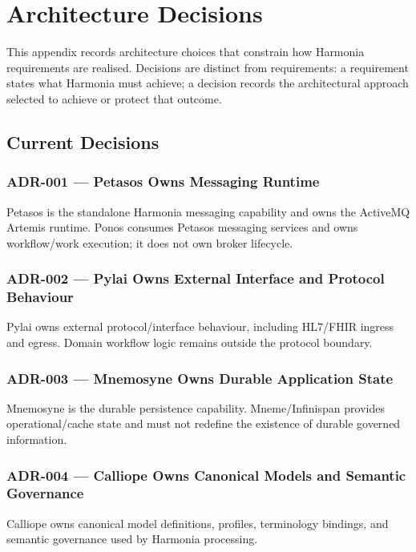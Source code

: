 
\chapter{Architecture Decisions}
\label{app:decisions}

This appendix records architecture choices that constrain how Harmonia requirements are realised. Decisions are distinct from requirements: a requirement states what Harmonia must achieve; a decision records the architectural approach selected to achieve or protect that outcome.

\section{Current Decisions}

\subsection{ADR-001 --- Petasos Owns Messaging Runtime}
Petasos is the standalone Harmonia messaging capability and owns the ActiveMQ Artemis runtime. Ponos consumes Petasos messaging services and owns workflow/work execution; it does not own broker lifecycle.

\subsection{ADR-002 --- Pylai Owns External Interface and Protocol Behaviour}
Pylai owns external protocol/interface behaviour, including HL7/FHIR ingress and egress. Domain workflow logic remains outside the protocol boundary.

\subsection{ADR-003 --- Mnemosyne Owns Durable Application State}
Mnemosyne is the durable persistence capability. Mneme/Infinispan provides operational/cache state and must not redefine the existence of durable governed information.

\subsection{ADR-004 --- Calliope Owns Canonical Models and Semantic Governance}
Calliope owns canonical model definitions, profiles, terminology bindings, and semantic governance used by Harmonia processing.

